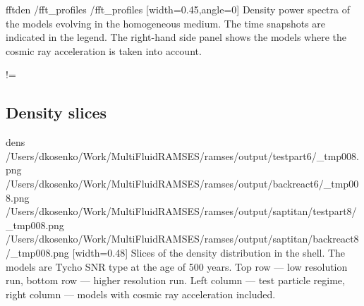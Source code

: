 \documentclass[referee,oldversion]{aa}
\def\basedir{/Users/dkosenko/Work/MultiFluidRAMSES/ramses/output}
\begin{document}
\def\fftd{fft_profiles}
\FIGG fftden  {\thom/\fftd}  {\bhom/\fftd}  [width=0.45\hsize,angle=0]  Density power spectra of the models evolving in the homogeneous medium. The time snapshots are indicated in the legend. The right-hand side panel shows the models where the cosmic ray acceleration is taken into account.

 

 



% 

% 

\if !=
\subsection{Density slices}

\FIGfo dens {\basedir/testpart6/_tmp008.png} {\basedir/backreact6/_tmp008.png}  {\basedir/saptitan/testpart8/_tmp008.png} {\basedir/saptitan/backreact8/_tmp008.png} [width=0.48\hsize] Slices of the density distribution in the shell. The models are Tycho SNR type at the age of 500 years. Top row --- low resolution run, bottom row --- higher resolution run. Left column --- test particle regime, right column --- models with cosmic ray acceleration included.
\end{document}
